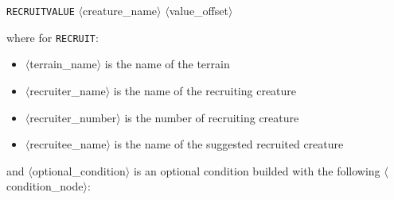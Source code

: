 \documentclass{article}
\begin{document}
\texttt{RECRUITVALUE} $\langle$creature\_name$\rangle$ $\langle$value\_offset$\rangle$

where for \texttt{RECRUIT}:

\begin{itemize}
\item $\langle$terrain\_name$\rangle$ is the name of the terrain
\item $\langle$recruiter\_name$\rangle$ is the name of the recruiting creature
\item $\langle$recruiter\_number$\rangle$ is the number of recruiting creature
\item $\langle$recruitee\_name$\rangle$ is the name of the suggested recruited creature
\end{itemize}

and $\langle$optional\_condition$\rangle$ is an optional condition builded with the following $\langle$condition\_node$\rangle$:
\end{document}
